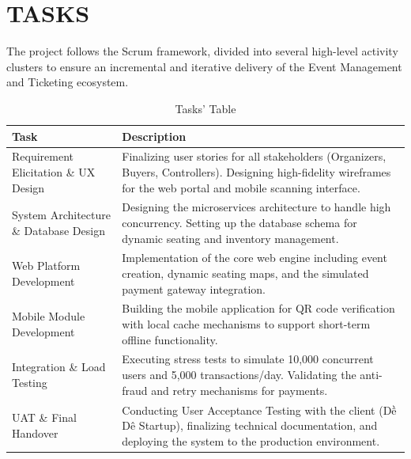 \chapter{TASKS}

The project follows the Scrum framework, divided into several high-level activity clusters to ensure an incremental and iterative delivery of the Event Management and Ticketing ecosystem.

\begin{table}[h!]
\centering
\renewcommand{\arraystretch}{1.5}
\begin{tabular}{|p{}|p{}|}
\hline
\rowcolor[HTML]{EFEFEF} 
\textbf{Task} & \textbf{Description} \\ \hline
Requirement Elicitation \& UX Design & Finalizing user stories for all stakeholders (Organizers, Buyers, Controllers). Designing high-fidelity wireframes for the web portal and mobile scanning interface. \\ \hline
System Architecture \& Database Design & Designing the microservices architecture to handle high concurrency. Setting up the database schema for dynamic seating and inventory management. \\ \hline
Web Platform Development & Implementation of the core web engine including event creation, dynamic seating maps, and the simulated payment gateway integration. \\ \hline
Mobile Module Development & Building the mobile application for QR code verification with local cache mechanisms to support short-term offline functionality. \\ \hline
Integration \& Load Testing & Executing stress tests to simulate 10,000 concurrent users and 5,000 transactions/day. Validating the anti-fraud and retry mechanisms for payments. \\ \hline
UAT \& Final Handover & Conducting User Acceptance Testing with the client (Dề Dê Startup), finalizing technical documentation, and deploying the system to the production environment. \\ \hline
\end{tabular}
\caption{Tasks' Table}
\end{table}
